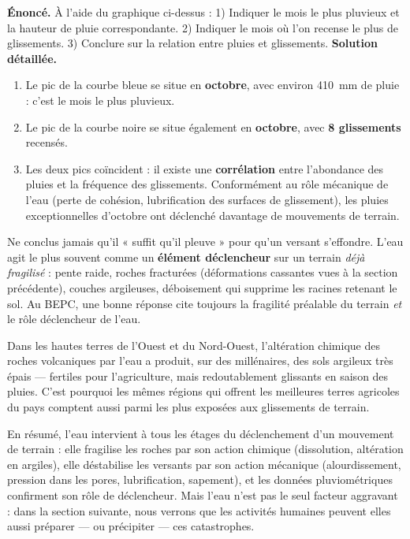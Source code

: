 \documentclass[11pt]{article}
\begin{document}
\begin{exoresolu}
\textbf{Énoncé.} À l'aide du graphique ci-dessus : 1) Indiquer le mois le plus pluvieux et la hauteur de pluie correspondante. 2) Indiquer le mois où l'on recense le plus de glissements. 3) Conclure sur la relation entre pluies et glissements.
\tcblower
\textbf{Solution détaillée.}
\begin{enumerate}
\item Le pic de la courbe bleue se situe en \textbf{octobre}, avec environ \SI{410}{mm} de pluie : c'est le mois le plus pluvieux.
\item Le pic de la courbe noire se situe également en \textbf{octobre}, avec \textbf{8 glissements} recensés.
\item Les deux pics coïncident : il existe une \textbf{corrélation} entre l'abondance des pluies et la fréquence des glissements. Conformément au rôle mécanique de l'eau (perte de cohésion, lubrification des surfaces de glissement), les pluies exceptionnelles d'octobre ont déclenché davantage de mouvements de terrain.
\end{enumerate}
\end{exoresolu}

\begin{attention}
Ne conclus jamais qu'il « suffit qu'il pleuve » pour qu'un versant s'effondre. L'eau agit le plus souvent comme un \textbf{élément déclencheur} sur un terrain \emph{déjà fragilisé} : pente raide, roches fracturées (déformations cassantes vues à la section précédente), couches argileuses, déboisement qui supprime les racines retenant le sol. Au BEPC, une bonne réponse cite toujours la fragilité préalable du terrain \emph{et} le rôle déclencheur de l'eau.
\end{attention}

\begin{savaistu}
Dans les hautes terres de l'Ouest et du Nord-Ouest, l'altération chimique des roches volcaniques par l'eau a produit, sur des millénaires, des sols argileux très épais — fertiles pour l'agriculture, mais redoutablement glissants en saison des pluies. C'est pourquoi les mêmes régions qui offrent les meilleures terres agricoles du pays comptent aussi parmi les plus exposées aux glissements de terrain.
\end{savaistu}

En résumé, l'eau intervient à tous les étages du déclenchement d'un mouvement de terrain : elle fragilise les roches par son action chimique (dissolution, altération en argiles), elle déstabilise les versants par son action mécanique (alourdissement, pression dans les pores, lubrification, sapement), et les données pluviométriques confirment son rôle de déclencheur. Mais l'eau n'est pas le seul facteur aggravant : dans la section suivante, nous verrons que les activités humaines peuvent elles aussi préparer — ou précipiter — ces catastrophes.
\end{document}
